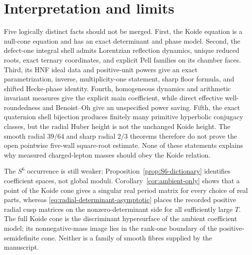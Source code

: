 \documentclass[11pt]{article}
\numberwithin{equation}{section}
\theoremstyle{definition}
\theoremstyle{remark}
\begin{document}


\section{Interpretation and limits}

Five logically distinct facts should not be merged.  First, the Koide equation is a null-cone equation and has an exact determinant and phase model.  Second, the defect-one integral shell admits Lorentzian reflection dynamics, unique reduced roots, exact ternary coordinates, and explicit Pell families on its chamber faces.  Third, its HNF ideal data and positive-unit powers give an exact parametrization, inverse, multiplicity-one statement, sharp floor formula, and shifted Hecke-phase identity.  Fourth, homogeneous dynamics and arithmetic invariant measures give the explicit main coefficient, while direct effective well-roundedness and Benoist--Oh give an unspecified power saving.  Fifth, the exact quaternion shell bijection produces finitely many primitive hyperbolic conjugacy classes, but the radial Huber height is not the unchanged Koide height.  The smooth radial $39/64$ and sharp radial $2/3$ theorems therefore do not prove the open pointwise five-wall square-root estimate.  None of these statements explains why measured charged-lepton masses should obey the Koide relation.

The $S^6$ occurrence is still weaker: Proposition~\ref{prop:S6-dictionary} identifies coefficient spaces, not global moduli.  Corollary~\ref{cor:ambient-only} shows that a point of the Koide cone gives a singular real period matrix for every choice of real parts, whereas \eqref{eq:radial-determinant-asymptotic} places the recorded positive radial cusp matrices on the nonzero-determinant side for all sufficiently large $T$.  The full Koide cone is the discriminant hypersurface of the ambient coefficient model; its nonnegative-mass image lies in the rank-one boundary of the positive-semidefinite cone.  Neither is a family of smooth fibres supplied by the manuscript.



\end{document}
